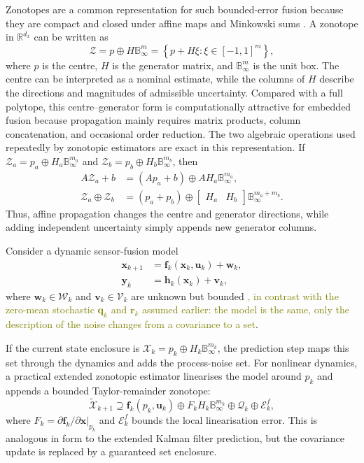 Zonotopes are a common representation for such bounded-error fusion because they are compact and closed under affine maps and Minkowski sums \cite{girard2005_zonotopes}. A zonotope in $\mathbb{R}^{d_x}$ can be written as
\begin{equation}
\mathcal{Z}=p\oplus H\mathbb{B}_{\infty}^{m}
=\left\{p+H\xi:\xi\in[-1,1]^m\right\},
\end{equation}
where $p$ is the centre, $H$ is the generator matrix, and $\mathbb{B}_{\infty}^{m}$ is the unit box. The centre can be interpreted as a nominal estimate, while the columns of $H$ describe the directions and magnitudes of admissible uncertainty. Compared with a full polytope, this centre--generator form is computationally attractive for embedded fusion because propagation mainly requires matrix products, column concatenation, and occasional order reduction.
The two algebraic operations used repeatedly by zonotopic estimators are exact in this representation. If $\mathcal{Z}_a=p_a\oplus H_a\mathbb{B}_{\infty}^{m_a}$ and $\mathcal{Z}_b=p_b\oplus H_b\mathbb{B}_{\infty}^{m_b}$, then
\begin{align}
A\mathcal{Z}_a+b
&=(Ap_a+b)\oplus AH_a\mathbb{B}_{\infty}^{m_a},\\
\mathcal{Z}_a\oplus\mathcal{Z}_b
&=(p_a+p_b)\oplus
\begin{bmatrix}H_a&H_b\end{bmatrix}
\mathbb{B}_{\infty}^{m_a+m_b}.
\end{align}
Thus, affine propagation changes the centre and generator directions, while adding independent uncertainty simply appends new generator columns.

Consider a dynamic sensor-fusion model
\begin{align}
\mathbf{x}_{k+1}&=\mathbf{f}_k(\mathbf{x}_k,\mathbf{u}_k)+\mathbf{w}_k,\\
\mathbf{y}_k&=\mathbf{h}_k(\mathbf{x}_k)+\mathbf{v}_k,
\end{align}
where $\mathbf{w}_k\in\mathcal{W}_k$ and $\mathbf{v}_k\in\mathcal{V}_k$ are unknown but bounded
\textcolor{olive}{, in contrast with the zero-mean stochastic $\mathbf{q}_k$ and $\mathbf{r}_k$ assumed earlier: the model is the same, only the description of the noise changes from a covariance to a set}. 

If the current state enclosure is $\mathcal{X}_k=p_k\oplus H_k\mathbb{B}_{\infty}^{m_k}$, the prediction step maps this set through the dynamics and adds the process-noise set. For nonlinear dynamics, a practical extended zonotopic estimator linearises the model around $p_k$ and appends a bounded Taylor-remainder zonotope:
\begin{equation}
\widetilde{\mathcal{X}}_{k+1}
\supseteq
\mathbf{f}_k(p_k,\mathbf{u}_k)
\oplus F_k H_k\mathbb{B}_{\infty}^{m_k}
\oplus \mathcal{Q}_k
\oplus \mathcal{E}^{f}_k,
\end{equation}
where $F_k=\partial \mathbf{f}_k/\partial \mathbf{x}|_{p_k}$ and $\mathcal{E}^{f}_k$ bounds the local linearisation error. This is analogous in form to the extended Kalman filter prediction, but the covariance update is replaced by a guaranteed set enclosure.


